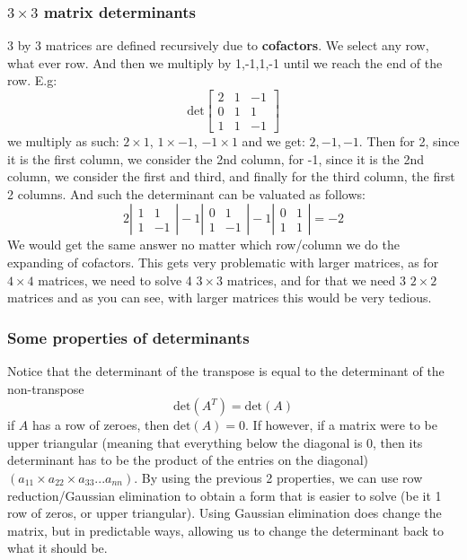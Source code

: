 \documentclass[11pt]{book}
\begin{document}
{{\subsubsection{$3\times 3$ matrix determinants}
\par{3 by 3 matrices are defined recursively due to \textbf{cofactors}. We select any row, what ever row. And then we multiply by 1,-1,1,-1 until we reach the end of the row. E.g: \[
\mathrm{det}\left[
	\begin{matrix}
		2 & 1 & -1 \\
		0 & 1 & 1 \\
		1 & 1 & -1 
	\end{matrix}
\right]
\] we multiply as such: $2 \times 1$,  $1 \times -1$,  $-1 \times 1$ and we get:  $2,-1,-1$. Then for 2, since it is the first column, we consider the 2nd column, for -1, since it is the 2nd column, we consider the first and third, and finally for the third column, the first 2 columns. And such the determinant can be valuated as follows: \[
2\left|
\begin{matrix}
	1 & 1\\ 1 & -1
\end{matrix}
\right| -1\left|
\begin{matrix}
	0 & 1\\ 1 & -1
\end{matrix}
\right|-1\left|
\begin{matrix}
	0 & 1\\ 1 & 1
\end{matrix}
\right|=-2
\] We would get the same answer no matter which row/column we do the expanding of cofactors. This gets very problematic with larger matrices, as for $4\times 4$ matrices, we need to solve 4  $3\times 3$ matrices, and for that we need 3 $2\times 2$ matrices and as you can see, with larger matrices this would be very tedious. 
}
\subsubsection{Some properties of determinants}
\par{Notice that the determinant of the transpose is equal to the determinant of the non-transpose \[
\mathrm{det}\left(A^{T}\right)=\mathrm{det}\left(A\right)
\] if $A$ has a row of zeroes, then  $\mathrm{det}\left(A\right)=0$. If however, if a matrix were to be upper triangular (meaning that everything below the diagonal is 0, then its determinant has to be the product of the entries on the diagonal) $\left(a_{11}\times a_{22}\times a_{33}...a_{nn}\right)$. By using the previous 2 properties, we can use row reduction/Gaussian elimination to obtain a form that is easier to solve (be it 1 row of zeros, or upper triangular). Using Gaussian elimination does change the matrix, but in predictable ways, allowing us to change the determinant back to what it should be.}
}}
\end{document}
